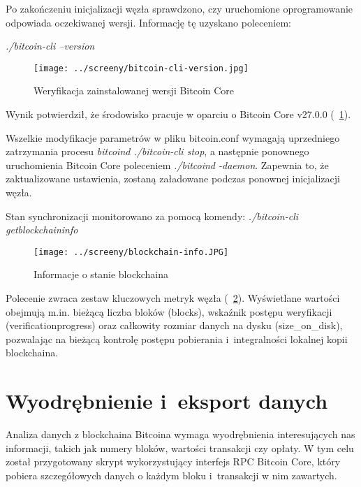 \documentclass[12pt,a4paper]{report}
\theoremstyle{definition} %
\begin{document}
	Po zakończeniu inicjalizacji węzła sprawdzono, czy uruchomione oprogramowanie odpowiada oczekiwanej wersji. Informację tę uzyskano poleceniem:
	\begin{center}
	\textit{./bitcoin-cli –version}
	\end{center}

	\begin{figure}[H]
	    \centering
	    \texttt{[image: ../screeny/bitcoin-cli-version.jpg]} 
	    \caption{Weryfikacja zainstalowanej wersji Bitcoin Core}
	    \label{fig:version}
	\end{figure}
	
	\noindent Wynik potwierdził, że środowisko pracuje w oparciu o Bitcoin Core v27.0.0 (\figurename~\ref{fig:version}).

	Wszelkie modyfikacje parametrów w pliku bitcoin.conf wymagają uprzedniego zatrzymania procesu \textit{bitcoind ./bitcoin-cli stop}, a następnie ponownego uruchomienia Bitcoin Core poleceniem \textit{./bitcoind -daemon}. Zapewnia to, że zaktualizowane ustawienia, zostaną załadowane podczas ponownej inicjalizacji węzła.

	Stan synchronizacji monitorowano za pomocą komendy: \textit{./bitcoin-cli getblockchaininfo}

	\begin{figure}[H]
	    \centering
	    \texttt{[image: ../screeny/blockchain-info.JPG]}
	    \caption{Informacje o stanie blockchaina}
	    \label{fig:blockchainINFO}
	\end{figure}	

	Polecenie zwraca zestaw kluczowych metryk węzła (\figurename~\ref{fig:blockchainINFO}). Wyświetlane wartości obejmują m.in. bieżącą liczba bloków (blocks), wskaźnik postępu weryfikacji (verificationprogress) oraz całkowity rozmiar danych na dysku (size\_on\_disk), pozwalając na bieżącą kontrolę postępu pobierania i~integralności lokalnej kopii 			blockchaina.

	\section{Wyodrębnienie i~eksport danych}
	\hspace*{\parindent}Analiza danych z blockchaina Bitcoina wymaga wyodrębnienia interesujących nas informacji, takich jak numery bloków, wartości transakcji czy opłaty. W tym celu został przygotowany skrypt wykorzystujący interfejs RPC Bitcoin Core, który pobiera szczegółowych danych o każdym bloku i~transakcji w nim zawartych. 
\end{document}
